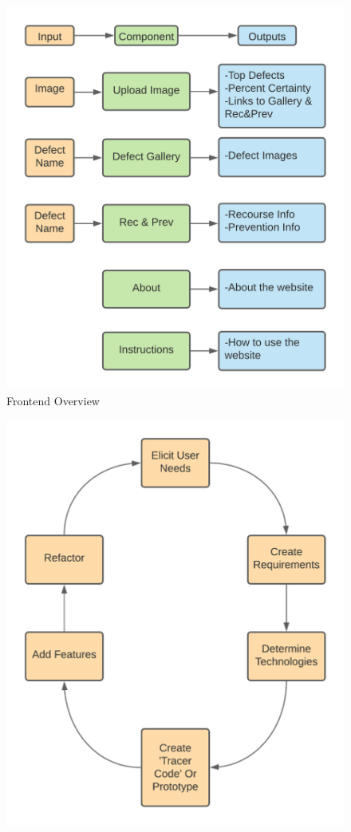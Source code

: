 \begin{appendices}
\begin{figure}[H]
\begin{center}
    \includegraphics[scale=0.7]{Images/Front-End-Overview}
    \caption{Frontend Overview}
    \label{fig:frontend_overview}
  \end{center}
\end{figure}
\begin{figure}[H]
  \begin{center}
    \includegraphics[scale=0.7]{Images/workflow}

\end{center}
\end{figure}
\end{appendices}
